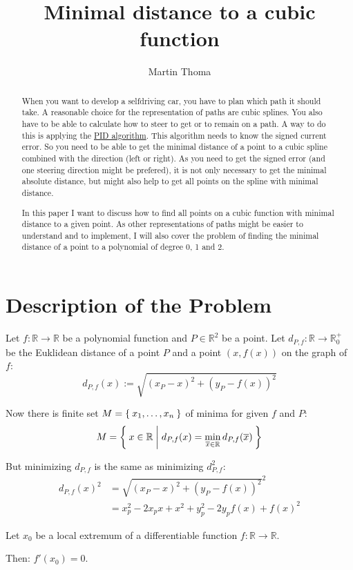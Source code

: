 \documentclass[a4paper]{scrartcl}
\title{Minimal distance to a cubic function}
\author{Martin Thoma}
\theoremstyle{break}
\def\mdr{\ensuremath{\mathbb{R}}}
\theoremstyle{nonumberplain}
\def\mdr{\ensuremath{\mathbb{R}}}
\begin{document}
\maketitle
\begin{abstract}
When you want to develop a selfdriving car, you have to plan which path 
it should take. A reasonable choice for the representation of
paths are cubic splines. You also have to be able to calculate
how to steer to get or to remain on a path. A way to do this
is applying the \href{https://en.wikipedia.org/wiki/PID_algorithm}{PID algorithm}.
This algorithm needs to know the signed current error. So you need to 
be able to get the minimal distance of a point to a cubic spline combined with the direction (left or right).
As you need to get the signed error (and one steering direction might
be prefered), it is not only necessary to
get the minimal absolute distance, but might also help to get all points
on the spline with minimal distance.

In this paper I want to discuss how to find all points on a cubic 
function with minimal distance to a given point.
As other representations of paths might be easier to understand and
to implement, I will also cover the problem of finding the minimal
distance of a point to a polynomial of degree 0, 1 and 2.
\end{abstract}

\section{Description of the Problem}
Let $f: \mdr \rightarrow \mdr$ be a polynomial function and $P \in \mdr^2$
be a point. Let $d_{P,f}: \mdr \rightarrow \mdr_0^+$
be the Euklidean distance of a point $P$ and a point $\left (x, f(x) \right )$
on the graph of $f$:
\[d_{P,f} (x) := \sqrt{(x_P - x)^2 + (y_P - f(x))^2}\]

Now there is finite set $M = \Set{x_1, \dots, x_n}$ of minima for given $f$ and $P$:
\[M = \Set{x \in \mdr | d_{P,f}(x) = \min_{\overline{x} \in \mdr} d_{P,f}(\overline{x})}\] 

But minimizing $d_{P,f}$ is the same as minimizing $d_{P,f}^2$:
\begin{align}
    d_{P,f}(x)^2    &= \sqrt{(x_P - x)^2 + (y_P - f(x))^2}^2\\
                &= x_p^2 - 2x_p x + x^2 + y_p^2 - 2y_p f(x) + f(x)^2
\end{align}

\begin{theorem}\label{thm:required-extremum-property}
    Let $x_0$ be a local extremum of a differentiable function $f: \mathbb{R} \rightarrow \mathbb{R}$.

    Then: $f'(x_0) = 0$.
\end{theorem}
\clearpage
\end{document}
